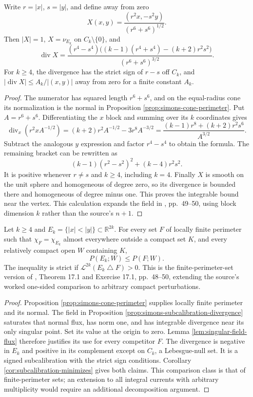 \begin{proposition}\label{prop:simons-subcalibration-divergence}
Write $r=|x|$, $s=|y|$, and define away from zero
\[
 X(x,y)=\frac{(r^2x,-s^2y)}{(r^6+s^6)^{1/2}}.
\]
Then $|X|=1$, $X=\nu_{E_k}$ on $C_k\setminus\{0\}$, and
\[
 \operatorname{div}X=
 \frac{(r^4-s^4)\bigl((k-1)(r^4+s^4)-(k+2)r^2s^2\bigr)}{(r^6+s^6)^{3/2}}.
\]
For $k\geq4$, the divergence has the strict sign of $r-s$ off $C_k$, and $|\operatorname{div}X|\leq A_k/|(x,y)|$ away from zero for a finite constant $A_k$.
\end{proposition}
\begin{proof}
The numerator has squared length $r^6+s^6$, and on the equal-radius cone its normalization is the normal in Proposition \ref{prop:simons-cone-perimeter}. Put $A=r^6+s^6$. Differentiating the $x$ block and summing over its $k$ coordinates gives
\[
 \operatorname{div}_x(r^2xA^{-1/2})
 =(k+2)r^2A^{-1/2}-3r^8A^{-3/2}
 =\frac{(k-1)r^8+(k+2)r^2s^6}{A^{3/2}}.
\]
Subtract the analogous $y$ expression and factor $r^4-s^4$ to obtain the formula. The remaining bracket can be rewritten as
\[
 (k-1)(r^2-s^2)^2+(k-4)r^2s^2.
\]
It is positive whenever $r\ne s$ and $k\geq4$, including $k=4$. Finally $X$ is smooth on the unit sphere and homogeneous of degree zero, so its divergence is bounded there and homogeneous of degree minus one. This proves the integrable bound near the vertex. This calculation expands the field in \cite{ChMin}, pp.~49--50, using block dimension $k$ rather than the source's $n+1$.
\end{proof}

\begin{theorem}\label{thm:simons-cone-minimizing}
Let $k\geq4$ and $E_k=\{|x|<|y|\}\subset\mathbb R^{2k}$. For every set $F$ of locally finite perimeter such that $\chi_F=\chi_{E_k}$ almost everywhere outside a compact set $K$, and every relatively compact open $W$ containing $K$,
\[
 P(E_k;W)\leq P(F;W).
\]
The inequality is strict if $\mathcal L^{2k}(E_k\mathbin{\triangle}F)>0$. This is the finite-perimeter-set version of \cite{ChMin}, Theorem 17.1 and Exercise 17.1, pp.~48--50, extending the source's worked one-sided comparison to arbitrary compact perturbations.
\end{theorem}
\begin{proof}
Proposition \ref{prop:simons-cone-perimeter} supplies locally finite perimeter and its normal. The field in Proposition \ref{prop:simons-subcalibration-divergence} saturates that normal flux, has norm one, and has integrable divergence near its only singular point. Set its value at the origin to zero. Lemma \ref{lem:singular-field-flux} therefore justifies its use for every competitor $F$. The divergence is negative in $E_k$ and positive in its complement except on $C_k$, a Lebesgue-null set. It is a signed subcalibration with the strict sign conditions. Corollary \ref{cor:subcalibration-minimizes} gives both claims. This comparison class is that of finite-perimeter sets; an extension to all integral currents with arbitrary multiplicity would require an additional decomposition argument.
\end{proof}


